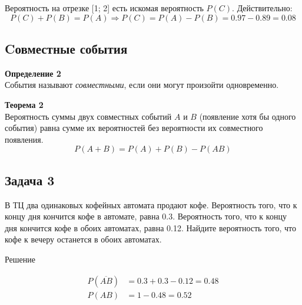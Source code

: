 \documentclass[a4paper,12pt]{article}
\begin{document}
Вероятность на отрезке [1; 2] есть искомая вероятность $P(C)$. Действительно:
$$P(C)+P(B)=P(A)\Rightarrow{}P(C)=P(A)-P(B)=0.97-0.89=0.08$$

\subsection{Cовместные события}

\textbf{Определение 2}\\
События называют \textit{совместными}, если они могут произойти одновременно.

\textbf{Теорема 2}\\
Вероятность суммы двух совместных событий $A$ и $B$ (появление хотя бы одного события) равна сумме их вероятностей без вероятности их совместного появления.
$$P(A+B)=P(A)+P(B)-P(AB)$$

\subsection*{Задача 3}
В ТЦ два одинаковых кофейных автомата продают кофе. Вероятность того, что к концу дня кончится кофе в автомате, равна 0.3.  Вероятность того, что к концу дня кончится кофе в обоих автоматах, равна 0.12. Найдите вероятность того, что кофе к вечеру останется в обоих автоматах.
\begin{center}
Решение
\end{center}
\begin{align*}
P(\overline{AB})&=0.3+0.3-0.12=0.48\\
P(AB) &= 1-0.48=0.52    
\end{align*}
\end{document}
